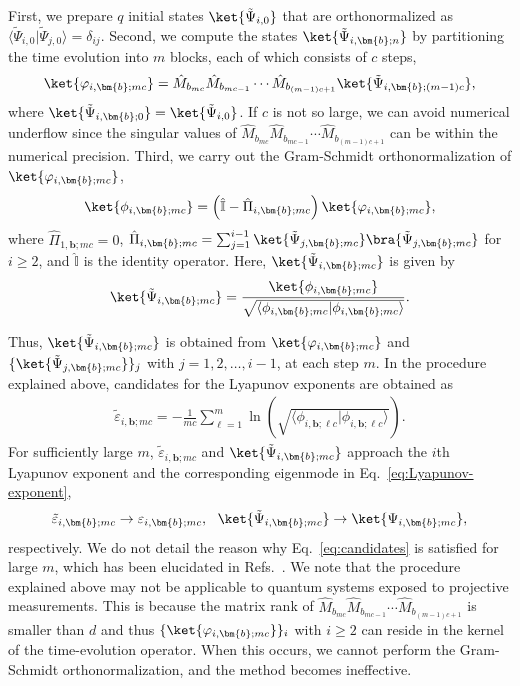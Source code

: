 \documentclass[preprint,pteplogo]{ptephy_v2}%
\numberwithin{equation}{section}
\theoremstyle{definition}
\begin{document}
First, we prepare $q$ initial states $\ket{\tilde{\Psi}_{i,0}}$ that are orthonormalized as $\langle\tilde{\Psi}_{i,0}|\tilde{\Psi}_{j,0}\rangle=\delta_{ij}$. 
Second, we compute the states $\ket{\tilde{\Psi}_{i,\bm{b};n}}$ by partitioning the time evolution into $m$ blocks, each of which consists of $c$ steps,
\begin{align}
    \ket{\varphi_{i,\bm{b};mc}}
    =\hat{M}_{b_{mc}}\hat{M}_{b_{mc-1}}\cdots\hat{M}_{b_{(m-1)c+1}}
    \ket{\tilde{\Psi}_{i,\bm{b};(m-1)c}},
\end{align}
where $\ket{\tilde{\Psi}_{i,\bm{b};0}}=\ket{\tilde{\Psi}_{i,0}}$. 
If $c$ is not so large, we can avoid numerical underflow since the singular values of $\hat{M}_{b_{mc}}\hat{M}_{b_{mc-1}}\cdots\hat{M}_{b_{(m-1)c+1}}$ can be within the numerical precision. 
Third, we carry out the Gram-Schmidt orthonormalization of $\ket{\varphi_{i,\bm{b};mc}}$,
\begin{align}
    \ket{\phi_{i,\bm{b};mc}}
    =\left(\hat{\mathbb{I}}-\hat{\Pi}_{i,\bm{b};mc}\right)
    \ket{\varphi_{i,\bm{b};mc}},
\end{align}
where $\hat{\Pi}_{1,\bm{b};mc}=0$, $\hat{\Pi}_{i,\bm{b};mc}=\sum_{j=1}^{i-1}\ket{\tilde{\Psi}_{j,\bm{b};mc}}\bra{\tilde{\Psi}_{j,\bm{b};mc}}$ for $i\geq2$, and $\hat{\mathbb{I}}$ is the identity operator. 
Here, $\ket{\tilde{\Psi}_{i,\bm{b};mc}}$ is given by
\begin{align}
    \ket{\tilde{\Psi}_{i,\bm{b};mc}}=\frac{\ket{\phi_{i,\bm{b};mc}}}
    {\sqrt{\langle\phi_{i,\bm{b};mc}|\phi_{i,\bm{b};mc}\rangle}}.
\end{align}

Thus, $\ket{\tilde{\Psi}_{i,\bm{b};mc}}$ is obtained from $\ket{\varphi_{i,\bm{b};mc}}$ and $\{\ket{\tilde{\Psi}_{j,\bm{b};mc}}\}_j$ with $j=1,2,\ldots,i-1$, at each step $m$. 
In the procedure explained above, candidates for the Lyapunov exponents are obtained as
\begin{align}
    \tilde{\varepsilon}_{i,\bm{b};mc}
    =-\frac{1}{mc}\sum_{\ell=1}^m\ln\left(\sqrt{\langle\phi_{i,\bm{b};\ell c}|\phi_{i,\bm{b};\ell c}\rangle}\right).
\end{align}
For sufficiently large $m$, $\tilde{\varepsilon}_{i,\bm{b};mc}$ and $\ket{\tilde{\Psi}_{i,\bm{b};mc}}$ approach the $i$th Lyapunov exponent and the corresponding eigenmode in Eq.~\eqref{eq:Lyapunov-exponent},
\begin{align}
    \tilde{\varepsilon}_{i,\bm{b};mc}\rightarrow\varepsilon_{i,\bm{b};mc},\ \ 
    \ket{\tilde{\Psi}_{i,\bm{b};mc}}\rightarrow\ket{\Psi_{i,\bm{b};mc}},
    \label{eq:candidates}
\end{align}
respectively. 
We do not detail the reason why Eq.~\eqref{eq:candidates} is satisfied for large $m$, which has been elucidated in Refs.~\cite{ershov1998concept, mochizuki2025transitions}. 
We note that the procedure explained above may not be applicable to quantum systems exposed to projective measurements. 
This is because the matrix rank of $\hat{M}_{b_{mc}}\hat{M}_{b_{mc-1}}\cdots\hat{M}_{b_{(m-1)c+1}}$ is smaller than $d$ and thus $\{\ket{\varphi_{i,\bm{b};mc}}\}_i$ with $i\geq2$ can reside in the kernel of the time-evolution operator. 
When this occurs, we cannot perform the Gram-Schmidt orthonormalization, and the method becomes ineffective. 
\end{document}
